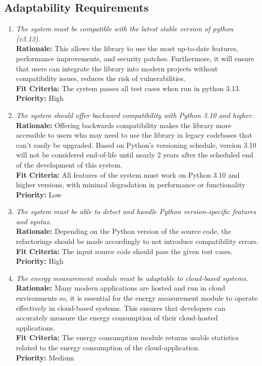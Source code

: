 \documentclass[12pt]{article}
\begin{document}
\subsection{Adaptability Requirements}
\begin{enumerate}[label=MS-AD \arabic*., wide=0pt, leftmargin=*]
  \item \emph{The system must be compatible with the latest stable
    version of python (v3.13).}\\
    {\bf Rationale:} This allows the library to use the most
    up-to-date features, performance improvements, and security
    patches. Furthermore, it will ensure that users can integrate the
    library into modern projects without compatibility issues,
    reduces the risk of vulnerabilities.\\
    {\bf Fit Criteria:} The system passes all test cases when run in
    python 3.13.\\
    {\bf Priority:} High

  \item \emph{The system should offer backward compatibility with
    Python 3.10 and higher.}\\
    {\bf Rationale:} Offering backwards compatibility makes the
    library more accessible to users who may need to use the library
    in legacy codebases that can't easily be upgraded. Based on
    Python's versioning schedule, version 3.10 will not be considered
    end-of-life until nearly 2 years after the scheduled end of the
    development of this system.\\
    {\bf Fit Criteria:} All features of the system must work on
    Python 3.10 and higher versions, with minimal degradation in
    performance or functionality\\
    {\bf Priority:} Low

  \item \emph{The system must be able to detect and handle Python
    version-specific features and syntax.}\\
    {\bf Rationale:} Depending on the Python version of the source
    code, the refactorings should be made accordingly to not
    introduce compatibility errors.\\
    {\bf Fit Criteria:} The input source code should pass the given
    test cases.\\
    {\bf Priority:} High

  \item \emph{The energy measurement module must be adaptable to
    cloud-based systems.}\\
    {\bf Rationale:} Many modern applications are hosted and run in
    cloud environments so, it is essential for the energy measurement
    module to operate effectively in cloud-based systems. This
    ensures that developers can accurately measure the energy
    consumption of their cloud-hosted applications.\\
    {\bf Fit Criteria:} The energy consumption module returns usable
    statistics related to the energy consumption of the cloud-application.\\
    {\bf Priority:} Medium


\end{enumerate}
\end{document}
